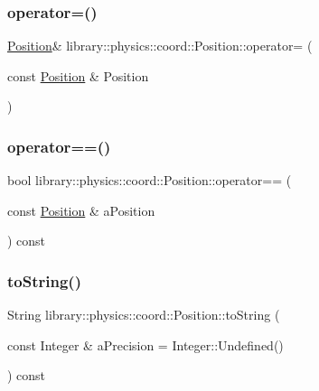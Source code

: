 \subsubsection{\texorpdfstring{operator=()}{operator=()}}
{\footnotesize\ttfamily \hyperlink{classlibrary_1_1physics_1_1coord_1_1_position}{Position}\& library\+::physics\+::coord\+::\+Position\+::operator= (\begin{DoxyParamCaption}\item[{const \hyperlink{classlibrary_1_1physics_1_1coord_1_1_position}{Position} \&}]{Position }\end{DoxyParamCaption})\hspace{0.3cm}{\ttfamily [delete]}}

\mbox{\label{classlibrary_1_1physics_1_1coord_1_1_position_a520bfdf64e8f45f60e815ebc72012fde}} 
\subsubsection{\texorpdfstring{operator==()}{operator==()}}
{\footnotesize\ttfamily bool library\+::physics\+::coord\+::\+Position\+::operator== (\begin{DoxyParamCaption}\item[{const \hyperlink{classlibrary_1_1physics_1_1coord_1_1_position}{Position} \&}]{a\+Position }\end{DoxyParamCaption}) const}

\mbox{\label{classlibrary_1_1physics_1_1coord_1_1_position_ab88010154fdbcb36b0e25b3986bcc80c}} 
\subsubsection{\texorpdfstring{to\+String()}{toString()}}
{\footnotesize\ttfamily String library\+::physics\+::coord\+::\+Position\+::to\+String (\begin{DoxyParamCaption}\item[{const Integer \&}]{a\+Precision = {\ttfamily Integer\+:\+:Undefined()} }\end{DoxyParamCaption}) const}

